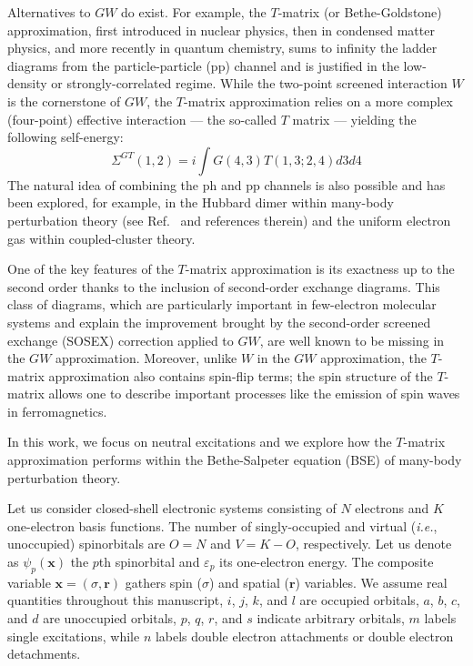 \documentclass[aip,jcp,reprint,noshowkeys,superscriptaddress]{revtex4-1}
\newcommand{\ie}{\textit{i.e.}}
\newcommand{\br}{\mathbf{r}}
\newcommand{\bx}{\mathbf{x}}
\newcommand{\e}[2]{\eps_{#1}^{#2}}
\newcommand{\SO}[1]{\psi_{#1}}
\newcommand{\eps}{\varepsilon}
\begin{document}
Alternatives to $GW$ do exist. For example, the $T$-matrix (or Bethe-Goldstone) approximation, first introduced in nuclear physics, \cite{Bethe_1957,Baym_1961,Baym_1962,Danielewicz_1984a,Danielewicz_1984b} then in condensed matter physics, \cite{Liebsch_1981,Bickers_1989,Bickers_1991,Katsnelson_1999,Katsnelson_2002,Zhukov_2005,vonFriesen_2010,Romaniello_2012,Gukelberger_2015} and more recently in quantum chemistry, \cite{Zhang_2017,Li_2021b} sums to infinity the ladder diagrams from the particle-particle (pp) channel and is justified in the low-density or strongly-correlated regime. \cite{Danielewicz_1984a,Danielewicz_1984b,Liebsch_1981,Shepherd_2014}
While the two-point screened interaction $W$ is the cornerstone of $GW$, the $T$-matrix approximation relies on a more complex (four-point) effective interaction --- the so-called $T$ matrix --- yielding the following self-energy: 
\begin{equation}
\label{eq:SigGT}
	\Sigma^{GT}(1,2) = i \int G(4,3) T(1,3;2,4) d3 d4
\end{equation}
The natural idea of combining the ph and pp channels is also possible and has been explored, for example, in the Hubbard dimer within many-body perturbation theory (see Ref.~ and references therein) and the uniform electron gas \cite{Loos_2016} within coupled-cluster theory. \cite{Shepherd_2014}

One of the key features of the $T$-matrix approximation is its exactness up to the second order thanks to the inclusion of second-order exchange diagrams.
This class of diagrams, which are particularly important in few-electron molecular systems \cite{Casida_1991,Ortiz_2013,Hirata_2015,Hirata_2017} and explain the improvement brought by the second-order screened exchange (SOSEX) correction applied to $GW$, \cite{Romaniello_2009a,Ren_2015,Loos_2018b} are well known to be missing in the $GW$ approximation. Moreover, unlike $W$ in the $GW$ approximation, the $T$-matrix
approximation also contains spin-flip terms; the spin structure of the $T$-matrix allows one to describe important processes like the emission of spin waves in ferromagnetics. \cite{Zhukov_2004}

In this work, we focus on neutral excitations and we explore how the $T$-matrix approximation performs within the Bethe-Salpeter equation (BSE) of many-body perturbation theory.\cite{Salpeter_1951,Strinati_1988,Blase_2018,Blase_2020}

Let us consider closed-shell electronic systems consisting of $N$ electrons and $K$ one-electron basis functions.
The number of singly-occupied and virtual (\ie, unoccupied) spinorbitals are $O = N$ and $V = K - O$, respectively.
Let us denote as $\SO{p}(\bx)$ the $p$th spinorbital and $\e{p}{}$ its one-electron energy.
The composite variable $\bx = (\sigma,\br)$ gathers spin ($\sigma$) and spatial ($\br$) variables.
We assume real quantities throughout this manuscript, $i$, $j$, $k$, and $l$ are occupied orbitals, $a$, $b$, $c$, and $d$ are unoccupied orbitals, $p$, $q$, $r$, and $s$ indicate arbitrary orbitals, $m$ labels single excitations, while $n$ labels double electron attachments or double electron detachments.
\end{document}
